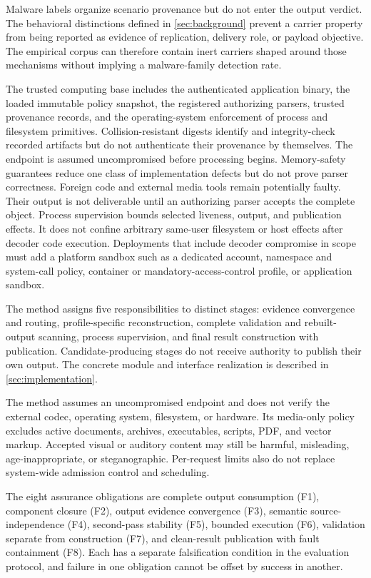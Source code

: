 Malware labels organize scenario provenance but do not enter the output verdict.
The behavioral distinctions defined in \cref{sec:background} prevent a carrier
property from being reported as evidence of replication, delivery role, or
payload objective. The empirical corpus can therefore contain inert carriers
shaped around those mechanisms without implying a malware-family detection rate.

The trusted computing base includes the authenticated application binary, the
loaded immutable policy snapshot, the registered authorizing parsers, trusted
provenance records, and the operating-system enforcement of process and
filesystem primitives. Collision-resistant digests identify and integrity-check
recorded artifacts but do not authenticate their provenance by themselves. The
endpoint is assumed uncompromised before processing begins. Memory-safety
guarantees reduce one class of implementation defects but do not prove parser
correctness. Foreign code and external media tools remain potentially faulty.
Their output is not deliverable until an authorizing parser accepts the complete
object. Process supervision bounds selected liveness, output, and publication
effects. It does not confine arbitrary same-user filesystem or host effects
after decoder code execution. Deployments that include decoder compromise in
scope must add a platform sandbox such as a dedicated account, namespace and
system-call policy, container or mandatory-access-control profile, or
application sandbox.

The method assigns five responsibilities to distinct stages: evidence
convergence and routing, profile-specific reconstruction, complete validation
and rebuilt-output scanning, process supervision, and final result construction
with publication. Candidate-producing stages do not receive authority to
publish their own output. The concrete module and interface realization is
described in \cref{sec:implementation}.

The method assumes an uncompromised endpoint and does not verify the external codec,
operating system, filesystem, or hardware. Its media-only policy excludes active
documents, archives, executables, scripts, PDF, and vector markup. Accepted
visual or auditory content may still be harmful, misleading, age-inappropriate,
or steganographic. Per-request limits also do not replace system-wide admission
control and scheduling.

The eight assurance obligations are complete output consumption (F1), component
closure (F2), output evidence convergence (F3), semantic source-independence
(F4), second-pass stability (F5), bounded execution (F6), validation separate
from construction (F7), and clean-result publication with fault containment
(F8). Each has a separate falsification condition in the evaluation protocol,
and failure in one obligation cannot be offset by success in another.
